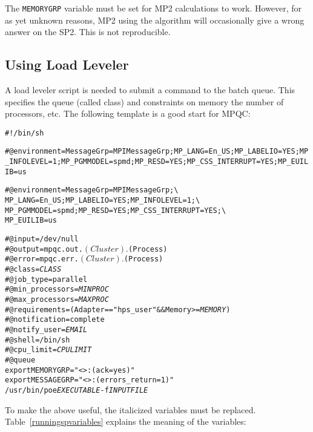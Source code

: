 The \verb|MEMORYGRP| variable must be set for MP2 calculations to work.
However, for as yet unknown reasons, MP2 using the  algorithm
will occasionally give a wrong answer on the SP2.  This is not
reproducible.

\subsection{Using Load Leveler}

A load leveler script is needed to submit a command to the batch queue.
This specifies the queue (called class) and constraints on memory the
number of processors, etc.  The following template is a good start for
MPQC:

\begin{alltt}
#!/bin/sh
\begin{htmlonly}
#@ environment = MessageGrp=MPIMessageGrp;MP_LANG=En_US;MP_LABELIO=YES;MP_INFOLEVEL=1;MP_PGMMODEL=spmd;MP_RESD=YES;MP_CSS_INTERRUPT=YES;MP_EUILIB=us
\end{htmlonly}
\begin{latexonly}
#@ environment = MessageGrp=MPIMessageGrp;\verb|\|
   MP_LANG=En_US;MP_LABELIO=YES;MP_INFOLEVEL=1;\verb|\|
   MP_PGMMODEL=spmd;MP_RESD=YES;MP_CSS_INTERRUPT=YES;\verb|\|
   MP_EUILIB=us
\end{latexonly}
#@ input = /dev/null
#@ output = mpqc.out.$(Cluster).$(Process)
#@ error = mpqc.err.$(Cluster).$(Process)
#@ class = {\itshape CLASS}
#@ job_type = parallel
#@ min_processors = {\itshape MINPROC}
#@ max_processors = {\itshape MAXPROC}
#@ requirements =  (Adapter == "hps_user" && Memory >= {\itshape MEMORY})
#@ notification = complete
#@ notify_user = {\itshape EMAIL}
#@ shell = /bin/sh
#@ cpu_limit = {\itshape CPULIMIT}
#@ queue
export MEMORYGRP="<>:(ack=yes)"
export MESSAGEGRP="<>:(errors_return=1)"
/usr/bin/poe {\itshape EXECUTABLE} -f {\itshape INPUTFILE}
\end{alltt}

To make the above useful, the italicized variables must be replaced.
Table~\ref{runningspvariables} explains the meaning of the variables:

